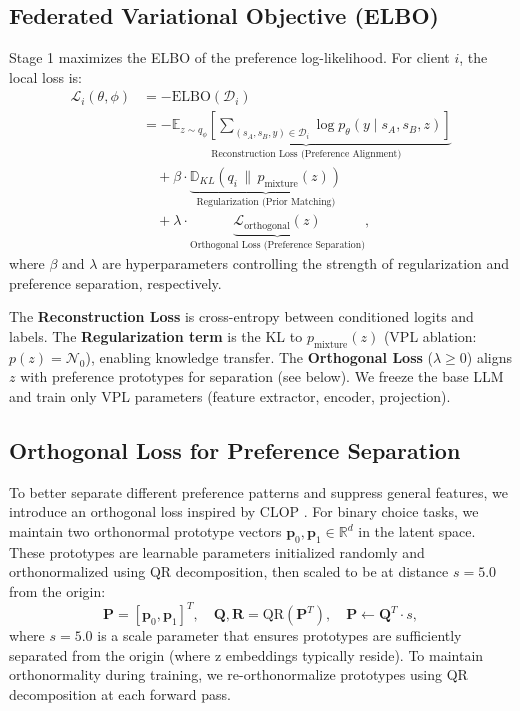 \subsection{Federated Variational Objective (ELBO)}
Stage 1 maximizes the ELBO of the preference log-likelihood. For client $i$, the local loss is:
\begin{align}
    \mathcal{L}_i(\theta, \phi) &= - \text{ELBO}(\mathcal{D}_i) \nonumber \\
    &= \underbrace{- \mathbb{E}_{z \sim q_\phi} \left[ \sum_{(s_A, s_B, y) \in \mathcal{D}_i} \log p_\theta(y \mid s_A, s_B, z) \right]}_{\text{Reconstruction Loss (Preference Alignment)}} \nonumber \\
    &\quad + \beta \cdot \underbrace{\mathbb{D}_{KL}(q_i \,\|\, p_{\text{mixture}}(z))}_{\text{Regularization (Prior Matching)}} \nonumber \\
    &\quad + \lambda \cdot \underbrace{\mathcal{L}_{\text{orthogonal}}(z)}_{\text{Orthogonal Loss (Preference Separation)}},
\end{align}
where $\beta$ and $\lambda$ are hyperparameters controlling the strength of regularization and preference separation, respectively.

The \textbf{Reconstruction Loss} is cross-entropy between conditioned logits and labels. The \textbf{Regularization term} is the KL to $p_{\text{mixture}}(z)$ (VPL ablation: $p(z) = \mathcal{N}_0$), enabling knowledge transfer. The \textbf{Orthogonal Loss} ($\lambda \geq 0$) aligns $z$ with preference prototypes for separation (see below). We freeze the base LLM and train only VPL parameters (feature extractor, encoder, projection).

\subsection{Orthogonal Loss for Preference Separation}
To better separate different preference patterns and suppress general features, we introduce an orthogonal loss inspired by CLOP \citep{li2024preventingcollapsecontrastivelearning}. For binary choice tasks, we maintain two orthonormal prototype vectors $\mathbf{p}_0, \mathbf{p}_1 \in \mathbb{R}^d$ in the latent space. These prototypes are learnable parameters initialized randomly and orthonormalized using QR decomposition, then scaled to be at distance $s = 5.0$ from the origin:
\begin{equation}
    \mathbf{P} = [\mathbf{p}_0, \mathbf{p}_1]^T, \quad \mathbf{Q}, \mathbf{R} = \text{QR}(\mathbf{P}^T), \quad \mathbf{P} \leftarrow \mathbf{Q}^T \cdot s,
\end{equation}
where $s = 5.0$ is a scale parameter that ensures prototypes are sufficiently separated from the origin (where z embeddings typically reside). To maintain orthonormality during training, we re-orthonormalize prototypes using QR decomposition at each forward pass.

